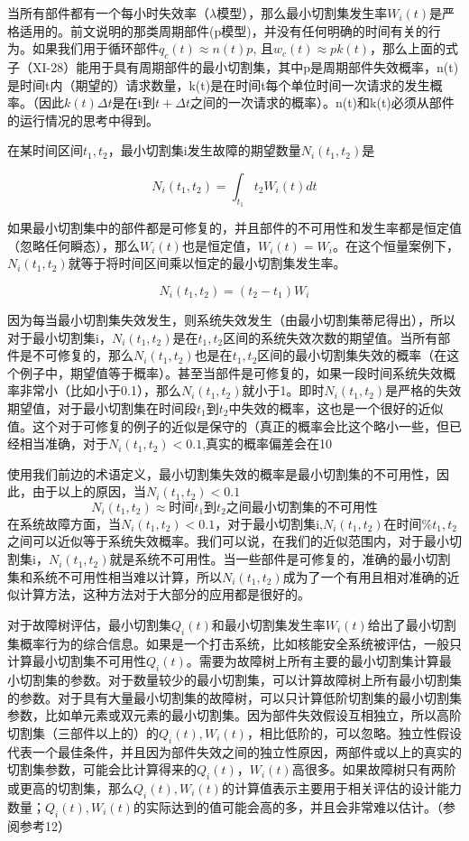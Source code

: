 \documentclass[cn,11pt,chinese]{elegantbook}
\begin{document}
{当所有部件都有一个每小时失效率（$\lambda$模型），那么最小切割集发生率$W_i(t)$是严格适用的。前文说明的那类周期部件(p模型)，并没有任何明确的时间有关的行为。如果我们用于循环部件$q_c(t) \approx n(t)p$, 且$w_c(t)\approx pk(t)$，那么上面的式子（XI-28）能用于具有周期部件的最小切割集，其中p是周期部件失效概率，n(t)是时间t内（期望的）请求数量，k(t)是在时间t每个单位时间一次请求的发生概率。（因此$k(t)\Delta t$是在t到$t+\Delta t$之间的一次请求的概率）。n(t)和k(t)必须从部件的运行情况的思考中得到。

在某时间区间$t_1,t_2$，最小切割集i发生故障的期望数量$N_i(t_1,t_2)$是

\begin{equation}\label{eq11-29}
N_i(t_1,t_2)=\int_{t_1}{t_2}W_i(t)dt 
\end{equation}

如果最小切割集中的部件都是可修复的，并且部件的不可用性和发生率都是恒定值（忽略任何瞬态），那么$W_i(t)$也是恒定值，$W_i(t)=W_i$。在这个恒量案例下，$N_i(t_1,t_2)$就等于将时间区间乘以恒定的最小切割集发生率。

\begin{equation}\label{eq11-30}
N_i(t_1,t_2) = (t_2-t_1)W_i 
\end{equation}


因为每当最小切割集失效发生，则系统失效发生（由最小切割集蒂尼得出），所以对于最小切割集i，$N_i(t_1,t_2)$是在$t_1,t_2$区间的系统失效次数的期望值。当所有部件是不可修复的，那么$N_i(t_1,t_2)$也是在$t_1,t_2$区间的最小切割集失效的概率（在这个例子中，期望值等于概率）。甚至当部件是可修复的，如果一段时间系统失效概率非常小（比如小于0.1），那么$N_i(t_1,t_2)$就小于1。即时$N_i(t_1,t_2)$是严格的失效期望值，对于最小切割集在时间段$t_1$到$t_2$中失效的概率，这也是一个很好的近似值。这个对于可修复的例子的近似是保守的（真正的概率会比这个略小一些，但已经相当准确，对于$N_i(t_1,t_2)<0.1$,真实的概率偏差会在10%

使用我们前边的术语定义，最小切割集失效的概率是最小切割集的不可用性，因此，由于以上的原因，当$N_i(t_1,t_2)<0.1$
$$N_i(t_1,t_2) \approx 时间t_1到t_2之间最小切割集的不可用性$$
在系统故障方面，当$N_i(t_1,t_2)<0.1$，对于最小切割集i,$N_i(t_1,t_2)$在时间$\%t_1,t_2$之间可以近似等于系统失效概率。我们可以说，在我们的近似范围内，对于最小切割集i，$N_i(t_1,t_2)$就是系统不可用性。当一些部件是可修复的，准确的最小切割集和系统不可用性相当难以计算，所以$N_i(t_1,t_2)$成为了一个有用且相对准确的近似计算方法，这种方法对于大部分的应用都是很好的。

对于故障树评估，最小切割集$Q_i(t)$和最小切割集发生率$W_i(t)$给出了最小切割集概率行为的综合信息。如果是一个打击系统，比如核能安全系统被评估，一般只计算最小切割集不可用性$Q_i(t)$。需要为故障树上所有主要的最小切割集计算最小切割集的参数。对于数量较少的最小切割集，可以计算故障树上所有最小切割集的参数。对于具有大量最小切割集的故障树，可以只计算低阶切割集的最小切割集参数，比如单元素或双元素的最小切割集。因为部件失效假设互相独立，所以高阶切割集（三部件以上的）的$Q_i(t),W_i(t)$，相比低阶的，可以忽略。独立性假设代表一个最佳条件，并且因为部件失效之间的独立性原因，两部件或以上的真实的切割集参数，可能会比计算得来的$Q_i(t)，W_i(t)$高很多。如果故障树只有两阶或更高的切割集，那么$Q_i(t),W_i(t)$的计算值表示主要用于相关评估的设计能力数量；$Q_i(t),W_i(t)$的实际达到的值可能会高的多，并且会非常难以估计。（参阅参考12）

}
\end{document}
